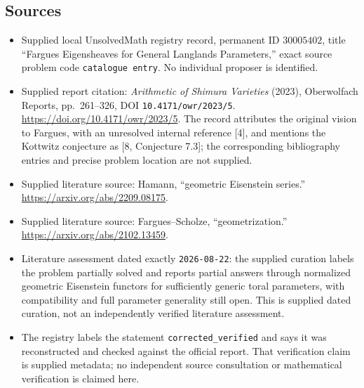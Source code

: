 \documentclass[11pt]{article}
\begin{document}
\subsection{Sources}
\begin{itemize}
\item Supplied local UnsolvedMath registry record, permanent ID \(30005402\), title ``Fargues Eigensheaves for General Langlands Parameters,'' exact source problem code \texttt{catalogue entry}. No individual proposer is identified.
\item Supplied report citation: \emph{Arithmetic of Shimura Varieties} (2023), Oberwolfach Reports, pp.~261--326, DOI \texttt{10.4171/owr/2023/5}. \url{https://doi.org/10.4171/owr/2023/5}. The record attributes the original vision to Fargues, with an unresolved internal reference [4], and mentions the Kottwitz conjecture as [8, Conjecture 7.3]; the corresponding bibliography entries and precise problem location are not supplied.
\item Supplied literature source: Hamann, ``geometric Eisenstein series.'' \url{https://arxiv.org/abs/2209.08175}.
\item Supplied literature source: Fargues--Scholze, ``geometrization.'' \url{https://arxiv.org/abs/2102.13459}.
\item Literature assessment dated exactly \texttt{2026-08-22}: the supplied curation labels the problem partially solved and reports partial answers through normalized geometric Eisenstein functors for sufficiently generic toral parameters, with compatibility and full parameter generality still open. This is supplied dated curation, not an independently verified literature assessment.
\item The registry labels the statement \texttt{corrected\_verified} and says it was reconstructed and checked against the official report. That verification claim is supplied metadata; no independent source consultation or mathematical verification is claimed here.
\end{itemize}
\end{document}
